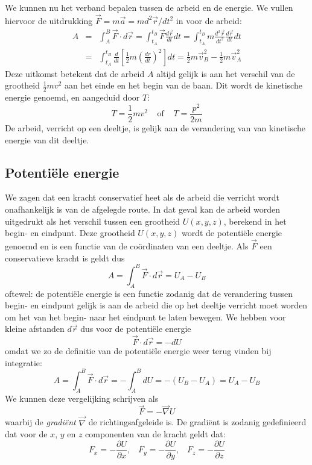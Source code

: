 We kunnen nu het verband bepalen tussen de arbeid en de energie. We
vullen hiervoor de uitdrukking $\vec{F} = m\vec{a}=md^2 \vec{r} /dt^2$ in voor de arbeid:
\begin{eqnarray}\label{e:arbeid}
A &=& \int_A^B \vec{F} \cdot d\vec{r} = \int_{t_A}^{t_B} \vec{F} \frac{d \vec{r}}{dt} dt =
\int_{t_A}^{t_B} m\frac{d^2\vec{r}}{dt^2} \frac{d \vec{r}}{dt} dt \\ \nonumber
& = &
\int_{t_A}^{t_B} \frac{d}{dt} \left[ \frac{1}{2} m\left( \frac{d r}{dt}\right)^2\right] dt =
\frac{1}{2} m\vec{v}_B^2 - \frac{1}{2}m\vec{v}_A^2
\end{eqnarray}
Deze uitkomst betekent dat de arbeid $A$ altijd gelijk is aan het verschil van de grootheid $\frac{1}{2}mv^2$
aan het einde en het begin van de baan. Dit wordt de kinetische energie genoemd, en aangeduid door $T$:
\begin{equation}
T=\frac{1}{2} m v^2 \;\;\;\; \mbox{of} \;\;\;\; T = \frac{p^2}{2m}
\end{equation}
De arbeid, verricht op een deeltje, is gelijk aan de verandering van
van kinetische energie van dit deeltje.

\subsection{Potenti\"ele energie}
We zagen dat een kracht conservatief heet als de arbeid die verricht
wordt onafhankelijk is van de afgelegde route. In dat geval kan de
arbeid worden uitgedrukt als het verschil tussen een grootheid
$U(x,y,z)$, berekend in het begin- en eindpunt. Deze grootheid
$U(x,y,z)$ wordt de potenti\"ele energie genoemd en is een functie van
de co\"ordinaten van een deeltje. Als $\vec{F}$ een conservatieve kracht
is geldt dus
\begin{equation}\label{e:pot}
A = \int_A^B \vec{F} \cdot d\vec{r} = U_A - U_B
\end{equation}
oftewel: de potenti\"ele energie is een functie zodanig dat de
verandering tussen begin- en eindpunt gelijk is aan de arbeid die op
het deeltje verricht moet worden om het van het begin- naar het
eindpunt te laten bewegen.
We hebben voor kleine afstanden $d\vec{r}$ dus voor de potenti\"ele energie
\begin{equation}
\vec{F} \cdot d\vec{r} = -d U 
\end{equation}
omdat we zo de definitie van de potenti\"ele energie weer terug vinden bij integratie:
\begin{equation}
A=\int_A^B \vec{F}\cdot d\vec{r} = -\int_A^B dU = -(U_B-U_A) = U_A-U_B
\end{equation}
We kunnen deze vergelijking schrijven als 
\begin{equation}
\vec{F} = -\vec{\nabla} U 
\end{equation}
waarbij de {\it gradi\"ent} $\vec{\nabla}$ de richtingsafgeleide is. De gradi\"ent is
zodanig gedefinieerd dat voor de $x$, $y$ en $z$ componenten van de kracht geldt dat:
\begin{equation}
F_x = -\frac{\partial U}{\partial x}, \;\;\;
F_y = -\frac{\partial U}{\partial y}, \;\;\;
F_z = -\frac{\partial U}{\partial z}
\end{equation} 
